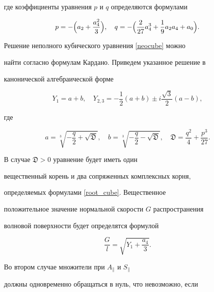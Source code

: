 где коэффициенты уравнения $p$ и $q$ определяются формулами

$$

p=-\Bigl(a_2+\dfrac{a_4^2}{3}\Bigr), \quad

q=-\Bigl(\dfrac{2}{27}a_4^3+\dfrac{1}{9}a_2a_4+a_0\Bigr).

$$



Решение неполного кубического уравнения \eqref{neocube} можно

найти согласно формулам Кардано. Приведем указанное решение в

канонической алгебраической форме

\begin{equation}

\label{root_cube}

Y_1= a + b, \quad

Y_{2,3}=-\frac{1}{2}(a+b) \pm i \frac{\sqrt{3}}{2}(a-b),

\end{equation}

где

\begin{equation}\nonumber

a=\sqrt[3]{-\frac{q}{2}+\sqrt{\mathfrak{D}}}, \quad

b=\sqrt[3]{-\frac{q}{2}-\sqrt{\mathfrak{D}}}, \quad

\mathfrak{D}=\frac{q^2}{4}+\frac{p^3}{27}.

\end{equation}

В случае $\mathfrak{D} > 0$ уравнение будет иметь один

вещественный корень и два сопряженных комплексных корня,

определяемых формулами \eqref{root_cube}. Вещественное

положительное значение нормальной скорости $G$ распространения

волновой поверхности будет определятся формулой

\begin{equation}\nonumber

\dfrac{G}{l}=\sqrt{Y_1 + \dfrac{a_4}{3}}.

\end{equation}



Во втором случае множители при $A_\parallel$ и $S_\parallel$

должны одновременно обращаться в нуль, что невозможно, если

